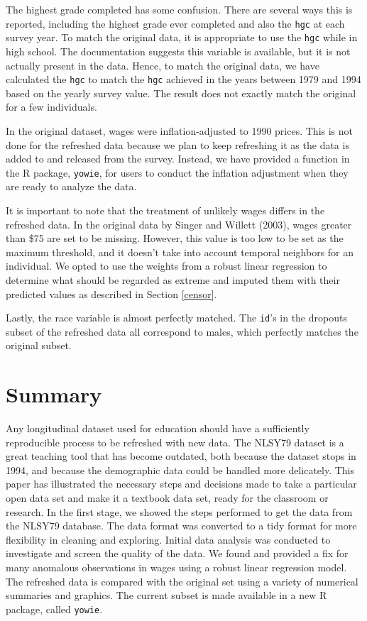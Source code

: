 \documentclass[12pt]{article}
\begin{document}
The highest grade completed has some confusion. There are several ways this is reported, including the highest grade ever completed and also the \texttt{hgc} at each survey year. To match the original data, it is appropriate to use the \texttt{hgc} while in high school. The documentation suggests this variable is available, but it is not actually present in the data. Hence, to match the original data, we have calculated the \texttt{hgc} to match the \texttt{hgc} achieved in the years between 1979 and 1994 based on the yearly survey value. The result does not exactly match the original for a few individuals.

In the original dataset, wages were inflation-adjusted to 1990 prices. This is not done for the refreshed data because we plan to keep refreshing it as the data is added to and released from the survey. Instead, we have provided a function in the R package, \texttt{yowie}, for users to conduct the inflation adjustment when they are ready to analyze the data.

It is important to note that the treatment of unlikely wages differs in the refreshed data. In the original data by Singer and Willett (2003), wages greater than \$75 are set to be missing. However, this value is too low to be set as the maximum threshold, and it doesn't take into account temporal neighbors for an individual. We opted to use the weights from a robust linear regression to determine what should be regarded as extreme and imputed them with their predicted values as described in Section \ref{censor}.

Lastly, the race variable is almost perfectly matched. The \texttt{id}'s in the dropouts subset of the refreshed data all correspond to males, which perfectly matches the original subset.

\hypertarget{summary}{%
\section{Summary}\label{summary}}

Any longitudinal dataset used for education should have a sufficiently reproducible process to be refreshed with new data. The NLSY79 dataset is a great teaching tool that has become outdated, both because the dataset stops in 1994, and because the demographic data could be handled more delicately. This paper has illustrated the necessary steps and decisions made to take a particular open data set and make it a textbook data set, ready for the classroom or research. In the first stage, we showed the steps performed to get the data from the NLSY79 database. The data format was converted to a tidy format for more flexibility in cleaning and exploring. Initial data analysis was conducted to investigate and screen the quality of the data. We found and provided a fix for many anomalous observations in wages using a robust linear regression model. The refreshed data is compared with the original set using a variety of numerical summaries and graphics. The current subset is made available in a new R package, called \texttt{yowie}.
\end{document}
